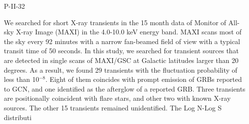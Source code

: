 P-II-32


\bigskip



\bigskip

\noindent We searched for short X-ray transients in the 15 month data of Monitor of All-sky X-ray Image (MAXI) in the 4.0-10.0 keV energy band.  MAXI scans most of the sky every 92 minutes with a narrow fan-beamed field of view with a typical transit time of 50 seconds.  In this study, we searched for transient sources that are detected in single scans of MAXI/GSC at Galactic latitudes larger than 20 degrees.  As a result, we found 29 transients with the fluctuation probability of less than 10$^{-8}$.
Eight of them coincides with prompt emission of GRBs reported to GCN, and one identified as the afterglow of a reported GRB.
Three transients are positionally coincident with flare stars, and other two with known X-ray sources.  
The other 15 transients remained unidentified.
The Log N-Log S distributi
